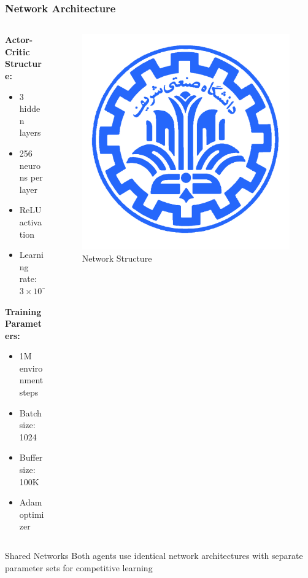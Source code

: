 \documentclass[
    11pt, %
    aspectratio=169, %
]{beamer}
\begin{document}
\begin{frame}
	\frametitle{Network Architecture}
	
	\begin{columns}[t]
		\begin{column}{0.5\textwidth}
			\textbf{Actor-Critic Structure:}
			\begin{itemize}
				\item 3 hidden layers
				\item 256 neurons per layer
				\item ReLU activation
				\item Learning rate: $3 \times 10^{-4}$
			\end{itemize}
			
			\vspace{0.3cm}
			\textbf{Training Parameters:}
			\begin{itemize}
				\item 1M environment steps
				\item Batch size: 1024
				\item Buffer size: 100K
				\item Adam optimizer
			\end{itemize}
		\end{column}
		\begin{column}{0.5\textwidth}
			\begin{figure}
				\centering
				\includegraphics[width=\textwidth]{network_architecture.png}
				\caption{Network Structure}
			\end{figure}
		\end{column}
	\end{columns}
	
	\begin{block}{Shared Networks}
		Both agents use identical network architectures with separate parameter sets for competitive learning
	\end{block}
\end{frame}
\end{document}
